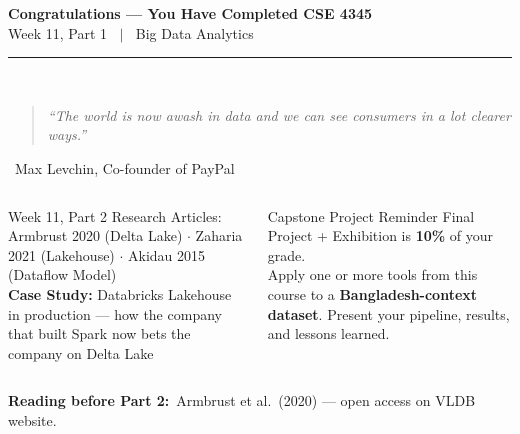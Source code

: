 \documentclass[aspectratio=169,10pt]{beamer}
\begin{document}
\begin{frame}[c]
  \begin{center}
    {\Large\bfseries Congratulations --- You Have Completed CSE 4345}\\[8pt]
    {\large Week 11, Part 1 $\;\mid\;$ Big Data Analytics}\\[8pt]
    \textcolor{PUGray}{\rule{7cm}{0.5pt}}\\[10pt]
    \begin{quote}
      \itshape ``The world is now awash in data and we can see consumers in a lot clearer ways.''
    \end{quote}
    \hfill\textemdash\ Max Levchin, Co-founder of PayPal

    \vspace{10pt}
    \begin{columns}
        \begin{block}{\centering Week 11, Part 2}
          \centering\small
          Research Articles: Armbrust 2020 (Delta Lake) $\cdot$ Zaharia 2021 (Lakehouse) $\cdot$ Akidau 2015 (Dataflow Model)\\[4pt]
          \textbf{Case Study:} Databricks Lakehouse in production --- how the company that built Spark now bets the company on Delta Lake
        \end{block}

        \begin{alertblock}{\centering Capstone Project Reminder}
          \centering\small
          Final Project + Exhibition is \textbf{10\%} of your grade.\\[4pt]
          Apply one or more tools from this course to a \textbf{Bangladesh-context dataset}.  Present your pipeline, results, and lessons learned.
        \end{alertblock}
    \end{columns}

    \vspace{6pt}
    \textbf{Reading before Part 2:}\ Armbrust et al.\ (2020) --- open access on VLDB website.
  \end{center}
\end{frame}

\end{document}
